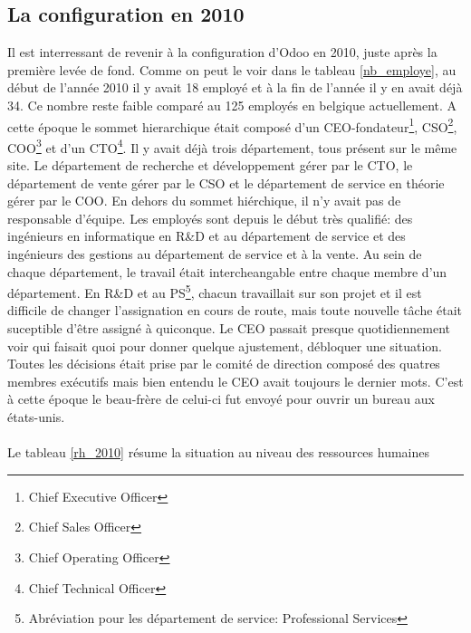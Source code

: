\subsection{La configuration en 2010}
Il est interressant de revenir à la configuration d'Odoo en 2010, juste après la première levée de fond. Comme on peut le voir dans le tableau \ref{nb_employe}, au début de l'année 2010 il y avait 18 employé et à la fin de l'année il y en avait déjà 34. Ce nombre reste faible comparé au 125 employés en belgique actuellement. A cette époque le sommet hierarchique était composé d'un CEO-fondateur\footnote{Chief Executive Officer}, CSO\footnote{Chief Sales Officer}, COO\footnote{Chief Operating Officer} et d'un CTO\footnote{Chief Technical Officer}. Il y avait déjà trois département, tous présent sur le même site. Le département de recherche et développement gérer par le CTO, le département de vente gérer par le CSO et le département de service en théorie gérer par le COO. En dehors du sommet hiérchique, il n'y avait pas de responsable d'équipe. Les employés sont depuis le début très qualifié: des ingénieurs en informatique en R\&D et au département de service et des ingénieurs des gestions au département de service et à la vente. Au sein de chaque département, le travail était intercheangable entre chaque membre d'un département. En R\&D et au PS\footnote{Abréviation pour les département de service: Professional Services}, chacun travaillait sur son projet et il est difficile de changer l'assignation en cours de route, mais toute nouvelle tâche était suceptible d'être assigné à quiconque. Le CEO passait presque quotidiennement voir qui faisait quoi pour donner quelque ajustement, débloquer une situation. Toutes les décisions était prise par le comité de direction composé des quatres membres exécutifs mais bien entendu le CEO avait toujours le dernier mots. C'est à cette époque le beau-frère de celui-ci fut envoyé pour ouvrir un bureau aux états-unis.  

\newpage
\paragraph{}Le tableau \ref{rh_2010} résume la situation au niveau des ressources humaines


